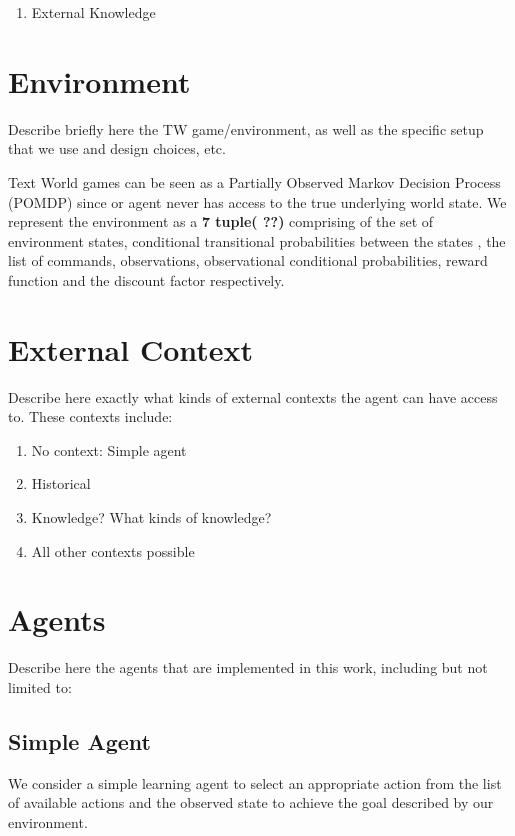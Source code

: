 \documentclass[letterpaper]{article} \usepackage{aaai20}  \usepackage{times}  \usepackage{helvet} \usepackage{courier}  \usepackage[hyphens]{url}  \usepackage{graphicx} \urlstyle{rm} \def\UrlFont{\rm}  \usepackage{graphicx}  \frenchspacing  \setlength{\pdfpagewidth}{8.5in}  \setlength{\pdfpageheight}{11in}
\begin{document}
\begin{enumerate}
\item External Knowledge
\end{enumerate}


\section{Environment}

Describe briefly here the TW game/environment, as well as the specific setup that we use and design choices, etc.

Text World games can be seen as a Partially Observed Markov Decision Process (POMDP) since or agent never has access to the true underlying world state. We represent the environment as a \textbf{7 tuple( ??)} comprising of the set of environment states, conditional transitional probabilities between the states , the list of commands, observations, observational conditional probabilities, reward function and the discount factor respectively.\cite{cote18textworld}


\section{External Context}

Describe here exactly what kinds of external contexts the agent can have access to. These contexts include:

\begin{enumerate}
    \item No context: Simple agent
    \item Historical
    \item Knowledge? What kinds of knowledge?
    \item All other contexts possible
\end{enumerate}



\section{Agents}

Describe here the agents that are implemented in this work, including but not limited to:

\subsection{Simple Agent}

We consider a simple learning agent to select an appropriate action from the list of available actions and the observed state to achieve the goal described by our environment.
\end{document}
